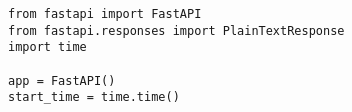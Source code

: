 \begin{verbatim}
from fastapi import FastAPI
from fastapi.responses import PlainTextResponse
import time

app = FastAPI()
start_time = time.time()
\end{verbatim}
